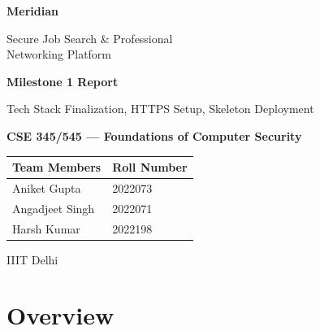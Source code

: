 \documentclass[12pt, a4paper]{article}
\begin{document}
\begin{titlepage}
    \centering
    \vspace*{2cm}

    {\Huge\bfseries\textcolor{meridiandark}{Meridian}\par}
    \vspace{0.5cm}
    {\Large\textcolor{meridianblue}{Secure Job Search \& Professional\\Networking Platform}\par}

    \vspace{1.5cm}

    {\LARGE\textbf{Milestone 1 Report}\par}
    \vspace{0.3cm}
    {\large Tech Stack Finalization, HTTPS Setup, Skeleton Deployment\par}

    \vspace{1.5cm}

    {\large\textbf{CSE 345/545 — Foundations of Computer Security}\par}

    \vspace{1.5cm}

    \begin{tabular}{ll}
        \toprule
        \textbf{Team Members} & \textbf{Roll Number} \\
        \midrule
        Aniket Gupta    & 2022073 \\
        Angadjeet Singh & 2022071 \\
        Harsh Kumar     & 2022198 \\
        \bottomrule
    \end{tabular}

    \vspace{2cm}

    {\large IIIT Delhi\par}
\end{titlepage}

\newpage
\tableofcontents
\newpage

\section{Overview}
\end{document}
